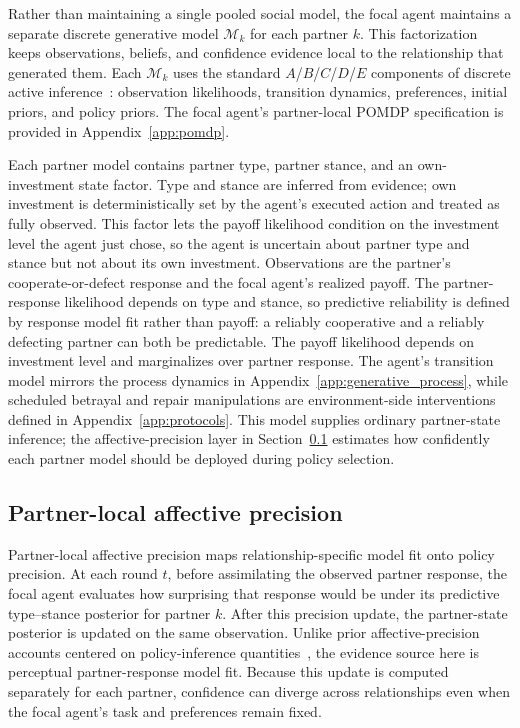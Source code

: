 Rather than maintaining a single pooled social model, the focal agent maintains a separate discrete generative model $\mathcal{M}_k$ for each partner $k$. This factorization keeps observations, beliefs, and confidence evidence local to the relationship that generated them. Each $\mathcal{M}_k$ uses the standard $A$/$B$/$C$/$D$/$E$ components of discrete active inference~\cite{DaCosta2020DiscreteSynthesis}: observation likelihoods, transition dynamics, preferences, initial priors, and policy priors. The focal agent's partner-local POMDP specification is provided in Appendix~\ref{app:pomdp}.

Each partner model contains partner type, partner stance, and an own-investment state factor. Type and stance are inferred from evidence; own investment is deterministically set by the agent's executed action and treated as fully observed. This factor lets the payoff likelihood condition on the investment level the agent just chose, so the agent is uncertain about partner type and stance but not about its own investment. Observations are the partner's cooperate-or-defect response and the focal agent's realized payoff. The partner-response likelihood depends on type and stance, so predictive reliability is defined by response model fit rather than payoff: a reliably cooperative and a reliably defecting partner can both be predictable. The payoff likelihood depends on investment level and marginalizes over partner response. The agent's transition model mirrors the process dynamics in Appendix~\ref{app:generative_process}, while scheduled betrayal and repair manipulations are environment-side interventions defined in Appendix~\ref{app:protocols}. This model supplies ordinary partner-state inference; the affective-precision layer in Section~\ref{sec:affective_precision} estimates how confidently each partner model should be deployed during policy selection.

\subsection{Partner-local affective precision}
\label{sec:affective_precision}

Partner-local affective precision maps relationship-specific model fit onto policy precision. At each round \(t\), before assimilating the observed partner response, the focal agent evaluates how surprising that response would be under its predictive type--stance posterior for partner \(k\). After this precision update, the partner-state posterior is updated on the same observation. Unlike prior affective-precision accounts centered on policy-inference quantities~\cite{Hesp2021DeeplyFeltAffect}, the evidence source here is perceptual partner-response model fit. Because this update is computed separately for each partner, confidence can diverge across relationships even when the focal agent's task and preferences remain fixed.

